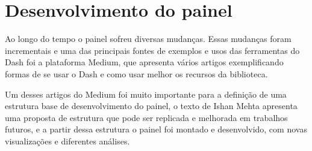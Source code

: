 \chapter{Desenvolvimento do painel}\label{cap_trabalho_academico}

Ao longo do tempo o painel sofreu diversas mudanças. Essas mudanças foram incrementais e uma das principais fontes de exemplos e usos das ferramentas do Dash foi a plataforma Medium, que apresenta vários artigos exemplificando formas de se usar o Dash e como usar melhor os recursos da biblioteca.

Um desses artigos do Medium foi muito importante para a definição de uma estrutura base de desenvolvimento do painel, o texto de Ishan Mehta \cite{medium1} apresenta uma proposta de estrutura que pode ser replicada e melhorada em trabalhos futuros, e a partir dessa estrutura o painel foi montado e desenvolvido, com novas visualizações e diferentes análises.

